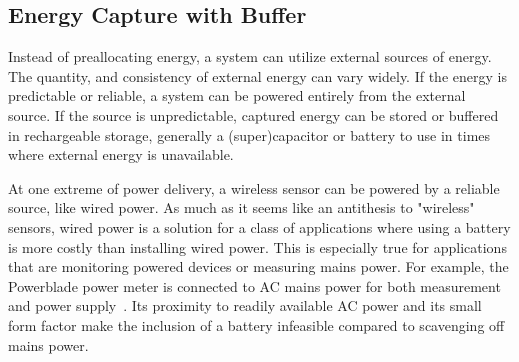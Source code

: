 \subsection{Energy Capture with Buffer}

Instead of preallocating energy, a system can utilize external sources of energy.
The quantity, and consistency of external energy can vary widely. If the energy is predictable or reliable, a system can be powered entirely from the external source. If the source is unpredictable, captured energy can be stored or buffered in rechargeable storage, generally a (super)capacitor or battery to use in times where external energy is unavailable.

At one extreme of power delivery, a wireless sensor can be powered by a reliable source, like wired power.
As much as it seems like an antithesis to "wireless" sensors, wired power is a solution for a class of applications where using a battery is more costly than installing wired power.
This is especially true for applications that are monitoring powered devices or measuring mains power.
For example, the Powerblade power meter is connected to AC mains power for both measurement and power supply~\cite{debruin15powerblade}.
Its proximity to readily available AC power and its small form factor make the inclusion of a battery infeasible compared to scavenging off mains power.

